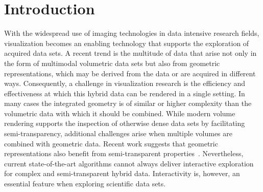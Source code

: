 \documentclass{egpubl}
\begin{document}
\section{Introduction}
\label{sec:introduction}

With the widespread use of imaging technologies in data intensive research fields, visualization becomes an enabling technology that supports the exploration of acquired data sets. 
A recent trend is the multitude of data that arise not only in the form of multimodal volumetric data sets but also from geometric representations, which may be derived from the data or are acquired in different ways.
Consequently, a challenge in visualization research is the efficiency and effectiveness at which this hybrid data can be rendered in a single setting. 
In many cases the integrated geometry is of similar or higher complexity than the volumetric data with which it should be combined. 
While modern volume rendering supports the inspection of otherwise dense data sets by facilitating semi-transparency, additional challenges arise when multiple volumes are combined with geometric data. 
Recent work suggests that geometric representations also benefit from semi-transparent properties~\cite{Guenther:2013:TOG}. 
Nevertheless, current state-of-the-art algorithms cannot always deliver interactive exploration for complex and semi-transparent hybrid data. 
Interactivity is, however, an essential feature when exploring scientific data sets.
\end{document}
